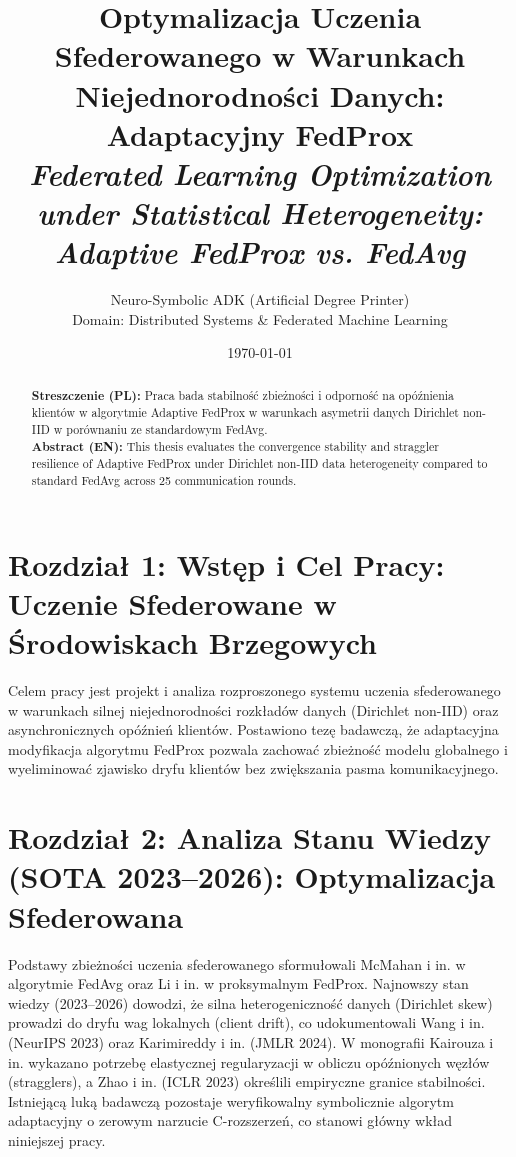 \documentclass[11pt,a4paper]{article}
\title{\textbf{Optymalizacja Uczenia Sfederowanego w Warunkach Niejednorodności Danych: Adaptacyjny FedProx}\\[0.4em]\large \textit{Federated Learning Optimization under Statistical Heterogeneity: Adaptive FedProx vs. FedAvg}}
\author{Neuro-Symbolic ADK (Artificial Degree Printer) \\ Domain: Distributed Systems & Federated Machine Learning}
\date{\today}
\begin{document}
\maketitle

\begin{abstract}
\noindent \textbf{Streszczenie (PL):} Praca bada stabilność zbieżności i odporność na opóźnienia klientów w algorytmie Adaptive FedProx w warunkach asymetrii danych Dirichlet non-IID w porównaniu ze standardowym FedAvg.\\[0.6em]
\noindent \textbf{Abstract (EN):} This thesis evaluates the convergence stability and straggler resilience of Adaptive FedProx under Dirichlet non-IID data heterogeneity compared to standard FedAvg across 25 communication rounds.
\end{abstract}

\section{Rozdział 1: Wstęp i Cel Pracy: Uczenie Sfederowane w Środowiskach Brzegowych}
Celem pracy jest projekt i analiza rozproszonego systemu uczenia sfederowanego w warunkach silnej niejednorodności rozkładów danych (Dirichlet non-IID) oraz asynchronicznych opóźnień klientów. Postawiono tezę badawczą, że adaptacyjna modyfikacja algorytmu FedProx pozwala zachować zbieżność modelu globalnego i wyeliminować zjawisko dryfu klientów bez zwiększania pasma komunikacyjnego.

\section{Rozdział 2: Analiza Stanu Wiedzy (SOTA 2023--2026): Optymalizacja Sfederowana}
Podstawy zbieżności uczenia sfederowanego sformułowali McMahan i in. \cite{mcmahan2017communication} w algorytmie FedAvg oraz Li i in. \cite{li2020federated} w proksymalnym FedProx. Najnowszy stan wiedzy (2023--2026) dowodzi, że silna heterogeniczność danych (Dirichlet skew) prowadzi do dryfu wag lokalnych (client drift), co udokumentowali Wang i in. \cite{wang2023tackling} (NeurIPS 2023) oraz Karimireddy i in. \cite{karimireddy2024scaffold} (JMLR 2024). W monografii Kairouza i in. \cite{kairouz2024advances} wykazano potrzebę elastycznej regularyzacji w obliczu opóźnionych węzłów (stragglers), a Zhao i in. \cite{zhao2023noniid} (ICLR 2023) określili empiryczne granice stabilności. Istniejącą luką badawczą pozostaje weryfikowalny symbolicznie algorytm adaptacyjny o zerowym narzucie C-rozszerzeń, co stanowi główny wkład niniejszej pracy.
\end{document}
